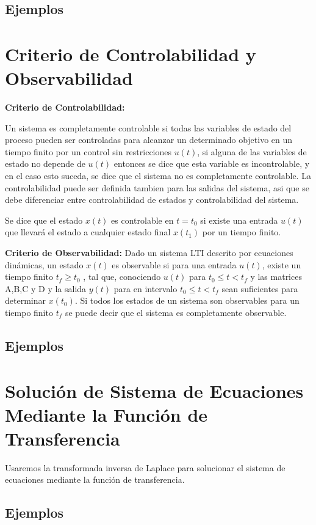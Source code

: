 \documentclass[12pt]{article}
\begin{document}
\subsection{Ejemplos}
\section{Criterio de Controlabilidad y Observabilidad}
\textbf{Criterio de Controlabilidad:}
\vspace{5mm}

Un sistema es completamente controlable si todas las variables de estado del proceso pueden ser controladas para alcanzar un determinado objetivo en un tiempo finito por un control sin restricciones $u(t)$, si alguna de las variables de estado no depende de $u(t)$ entonces se dice que esta variable es incontrolable, y en el caso esto suceda, se dice que el sistema no es completamente controlable. La controlabilidad puede ser definida tambien para las salidas del sistema, asi que se debe diferenciar entre controlabilidad de estados y controlabilidad del sistema.

Se dice que el estado $x(t)$ es controlable en $t=t_{0}$ si existe una entrada $u(t)$ que llevará el estado a cualquier estado final $x(t_{1})$ por un tiempo finito.

\vspace{5mm}
\textbf{Criterio de Observabilidad:}
\vspace{5mm}
Dado un sistema LTI descrito por ecuaciones dinámicas, un estado $x(t)$ es observable si para una entrada $u(t)$, existe un tiempo finito $t_{f}\geq t_{0}$ , tal que, conociendo $u(t)$ para $t_{0}\leq t<t_{f}$ y las matrices A,B,C y D y la salida $y(t)$ para en intervalo $t_{0}\leq t<t_{f}$ sean suficientes para determinar $x(t_{0})$. Si todos los estados de un sistema son observables para un tiempo finito $t_{f}$ se puede decir que el sistema es completamente observable.
\subsection{Ejemplos}


\section{Solución de Sistema de Ecuaciones Mediante la Función de Transferencia}
Usaremos la transformada inversa de Laplace para solucionar el sistema de ecuaciones mediante la función de transferencia.
\subsection{Ejemplos}
\end{document}
